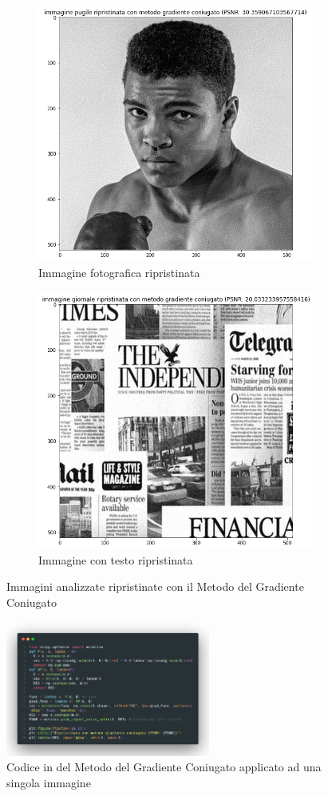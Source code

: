 \begin{figure}[H]
  \begin{subfigure}{0.5\textwidth}
    \centering
    \includegraphics[width=0.6\linewidth]{imgRel/pugilemgc.png}
    \caption{Immagine fotografica ripristinata}
    \label{fig:pugilemgc}
  \end{subfigure}\hfill
  \begin{subfigure}{0.5\textwidth}
    \centering
    \includegraphics[width=0.6\linewidth]{imgRel/giornalemgc.png}
    \caption{Immagine con testo ripristinata}
  \end{subfigure}
  \caption{Immagini analizzate ripristinate con il Metodo del Gradiente Coniugato}

  \centering
    \includegraphics[width=0.6\textwidth]{imgCode/metGradCon.png}
    \caption{Codice in  del Metodo del Gradiente Coniugato applicato ad una singola immagine}
    \label{fig:codeMGC}
\end{figure}

